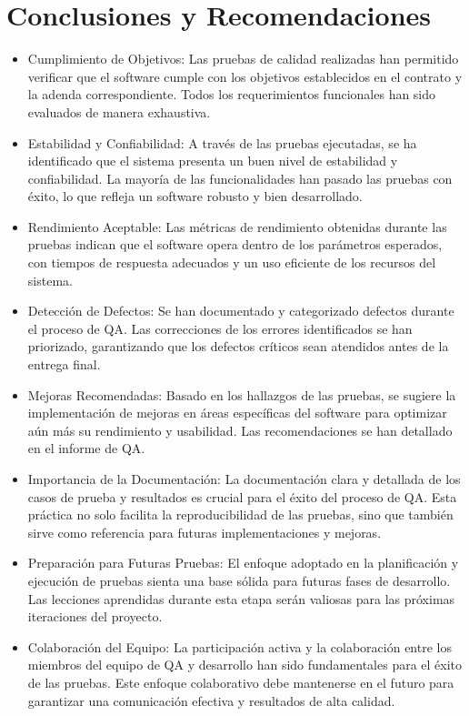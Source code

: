 \documentclass[12pt,letterpaper]{article}
\begin{document}
\section{Conclusiones y Recomendaciones}
\begin{itemize}
    \item Cumplimiento de Objetivos: Las pruebas de calidad realizadas han permitido verificar que el software cumple con los objetivos establecidos en el contrato y la adenda correspondiente. Todos los requerimientos funcionales han sido evaluados de manera exhaustiva.
    \item Estabilidad y Confiabilidad: A través de las pruebas ejecutadas, se ha identificado que el sistema presenta un buen nivel de estabilidad y confiabilidad. La mayoría de las funcionalidades han pasado las pruebas con éxito, lo que refleja un software robusto y bien desarrollado.
    \item Rendimiento Aceptable: Las métricas de rendimiento obtenidas durante las pruebas indican que el software opera dentro de los parámetros esperados, con tiempos de respuesta adecuados y un uso eficiente de los recursos del sistema.
    \item Detección de Defectos: Se han documentado y categorizado defectos durante el proceso de QA. Las correcciones de los errores identificados se han priorizado, garantizando que los defectos críticos sean atendidos antes de la entrega final.
    \item Mejoras Recomendadas: Basado en los hallazgos de las pruebas, se sugiere la implementación de mejoras en áreas específicas del software para optimizar aún más su rendimiento y usabilidad. Las recomendaciones se han detallado en el informe de QA.
    \item Importancia de la Documentación: La documentación clara y detallada de los casos de prueba y resultados es crucial para el éxito del proceso de QA. Esta práctica no solo facilita la reproducibilidad de las pruebas, sino que también sirve como referencia para futuras implementaciones y mejoras.
    \item Preparación para Futuras Pruebas: El enfoque adoptado en la planificación y ejecución de pruebas sienta una base sólida para futuras fases de desarrollo. Las lecciones aprendidas durante esta etapa serán valiosas para las próximas iteraciones del proyecto.
    \item Colaboración del Equipo: La participación activa y la colaboración entre los miembros del equipo de QA y desarrollo han sido fundamentales para el éxito de las pruebas. Este enfoque colaborativo debe mantenerse en el futuro para garantizar una comunicación efectiva y resultados de alta calidad.
\end{itemize}
\end{document}
